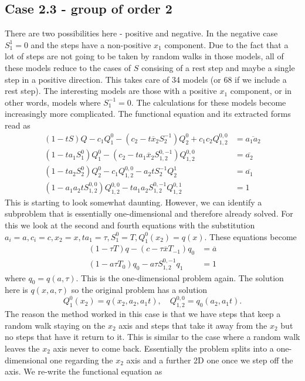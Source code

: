 \documentclass[12pt]{article}
\theoremstyle{definition} \newtheorem{definition}[theorem]{Definition}
\newcommand{\ol}[1]{\overline{#1}}
\newcommand{\Qf}[1]{Q_{1,2}^{#1}}
\newcommand{\Sf}[1]{S_{1,2}^{#1}}
\begin{document}
\subsection{Case 2.3 - group of order 2}
There are two possibilities here - positive and negative. In the negative case $S_1^1 = 0$ and the steps have a non-positive $x_1$ component. Due to the fact that a lot of steps are not going to be taken by random walks in those models, all of these models reduce to the cases of $S$ consising of a rest step and maybe a single step in a positive direction. This takes care of 34 models (or 68 if we include a rest step). The interesting models are those with a positive $x_1$ component, or in other words, models where $S_1^{-1} = 0$. The calculations for these models become increasingly more complicated. The functional equation and its extracted forms read as
\begin{align*}
(1-tS)Q - c_1 Q_1^0- (c_2 -t\ol{x}_2 S_2^{-1})Q_2^0+ c_1c_2 Q_{1,2}^{0,0}  &= \ol{a_1a_2}\\
(1-ta_1 S_1^0)Q_1^0 - (c_2 - ta_1 \ol{x}_2 \Sf{0,-1})Q_{1,2}^{0,0} &=\ol{a_2}\\
(1-ta_2 S_2^0)Q_2^0 - c_1Q_{1,2}^{0,0}  - a_2 t S_2^{-1} Q_2^1&=\ol{a_1}\\
(1-a_1 a_2 t \Sf{0,0})Q_{1,2}^{0,0} - ta_1 a_2 \Sf{0,-1} \Qf{0,1} &= 1
\end{align*}
This is starting to look somewhat daunting. However, we can identify a subproblem that is essentially one-dimensional and therefore already solved. For this we look at the second and fourth equations with the substitution $a_i = a, c_i = c, x_2 = x, ta_1 = \tau, S_1^0 = T, Q_1^0 (x_2)= q(x)$. These equations become
\begin{align*}
(1-\tau T)q - (c - \tau  \ol{x} T_{-1})q_0 &=\ol{a}\\
(1-a \tau T_0)q_0 - a\tau \Sf{0,-1} q_1 &= 1
\end{align*}
where $q_0 = q(a,\tau)$. This is the one-dimensional problem again. The solution here is $q(x,a,\tau)$ so the original problem has a solution
\[
	Q_1^0(x_2) = q(x_2,a_2,a_1t),\quad Q_{1,2}^{0,0} = q_0(a_2,a_1t).
\]
The reason the method worked in this case is that we have steps that keep a random walk staying on the $x_2$ axis and steps that take it away from the $x_2$ but no steps that have it return to it. This is similar to the case where a random walk leaves the $x_2$ axis never to come back. Essentially the problem splits into a one-dimensional one regarding the $x_2$ axis and a further 2D one once we step off the axis. We re-write the functional equation as
\end{document}
